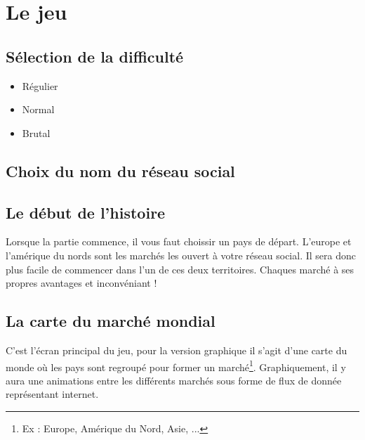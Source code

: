 \section{Le jeu}

\subsection{Sélection de la difficulté}
\begin{itemize}
    \item Régulier
    \item Normal
    \item Brutal
\end{itemize}
\subsection{Choix du nom du réseau social}
\subsection{Le début de l'histoire}
Lorsque la partie commence, il vous faut choissir un pays de départ. L'europe et l'amérique du nords sont les marchés les ouvert à votre réseau social. Il sera donc plus facile de commencer dans l'un de ces deux territoires. Chaques marché à ses propres avantages et inconvéniant !

\subsection{La carte du marché mondial}
C'est l'écran principal du jeu, pour la version graphique il s'agit d'une carte du monde où les pays sont regroupé pour former un marché\footnote{Ex : Europe, Amérique du Nord, Asie, ...}. Graphiquement, il y aura une animations entre les différents marchés sous forme de flux de donnée représentant internet.




